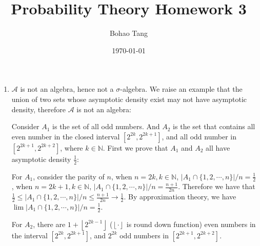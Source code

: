 \documentclass[11pt]{article}
\title{Probability Theory Homework 3}
\author{Bohao Tang}
\date{\today}
\newcommand{\floor}[1]{\left\lfloor #1 \right\rfloor}
\begin{document}
\maketitle

\begin{enumerate}[1.1.6]
    \item
    $\mathcal{A}$ is not an algebra, hence not a $\sigma$-algebra. We raise an example that the union of two sets whose asymptotic density exist may not have asymptotic density, therefore $\mathcal{A}$ is not an algebra:

    Consider $A_1$ is the set of all odd numbers. And $A_2$ is the set that contains all even number in the closed interval $[2^{2k}, 2^{2k+1}]$, and all odd number in $[2^{2k+1}, 2^{2k+2}]$, where $k \in \mathbb{N}$.
    First we prove that $A_1$ and $A_2$ all have asymptotic density $\frac{1}{2}$:

    For $A_1$, consider the parity of $n$, when $n = 2k, k\in \mathbb{N}$, $|A_1 \cap \{1,2,\cdots,n\}| / n = \frac{1}{2}$, when $n = 2k + 1, k \in \mathbb{N}$, $|A_1 \cap \{1,2,\cdots,n\}| / n = \frac{n + 1}{2n}$. Therefore we have that $\frac{1}{2} \le |A_1 \cap \{1,2,\cdots,n\}| / n \le \frac{n+1}{2n} \to \frac{1}{2}$. By approximation theory, we have $\lim |A_1 \cap \{1,2,\cdots,n\}| / n = \frac{1}{2}$.

    For $A_2$, there are $1 + \floor{2^{2k-1}}$ ($\floor{\cdot}$ is round down function) even numbers in the interval $[2^{2k}, 2^{2k+1}]$, and $2^{2k}$ odd numbers in $[2^{2k+1}, 2^{2k+2}]$.
    

\end{enumerate}
\end{document}
